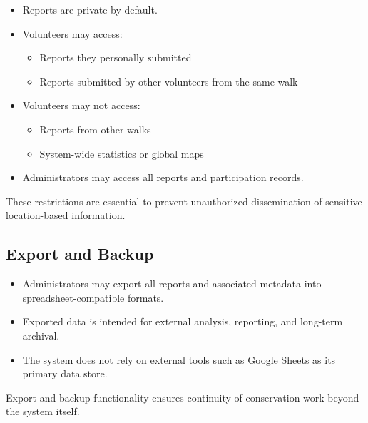 \documentclass[11pt]{article}
\begin{document}
\begin{itemize}
    \item Reports are private by default.
    \item Volunteers may access:
    \begin{itemize}
        \item Reports they personally submitted
        \item Reports submitted by other volunteers from the same walk
    \end{itemize}
    \item Volunteers may not access:
    \begin{itemize}
        \item Reports from other walks
        \item System-wide statistics or global maps
    \end{itemize}
    \item Administrators may access all reports and participation records.
\end{itemize}

These restrictions are essential to prevent unauthorized dissemination of sensitive location-based information.

\subsection{Export and Backup}

\begin{itemize}
    \item Administrators may export all reports and associated metadata into spreadsheet-compatible formats.
    \item Exported data is intended for external analysis, reporting, and long-term archival.
    \item The system does not rely on external tools such as Google Sheets as its primary data store.
\end{itemize}

Export and backup functionality ensures continuity of conservation work beyond the system itself.
\end{document}
